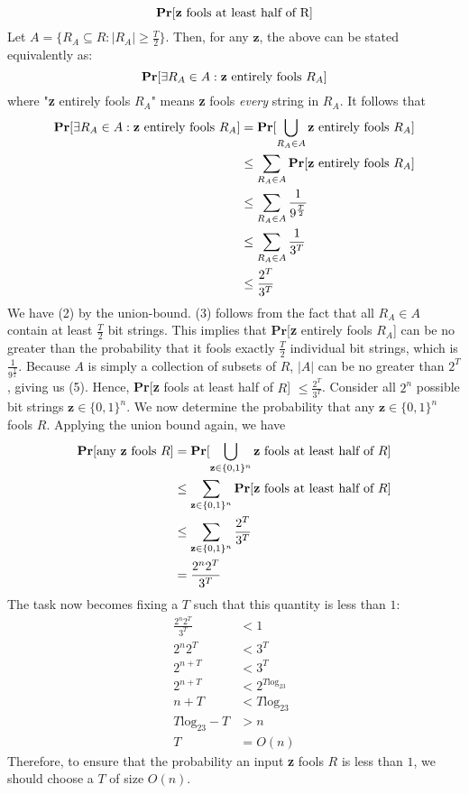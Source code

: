 \documentclass[12pt]{article}
\begin{document}
\begin{solution}
\begin{solution}
\[
\textbf{Pr}[\text{\textbf{z} fools at least half of R}]
\]
Let $A = \{R_A \subseteq R : |R_A| \geq \frac{T}{2}\}$. Then, for any $\textbf{z}$, the above can be stated equivalently as:
\[
\textbf{Pr}[\exists R_A \in A : \text{\textbf{z} entirely fools }R_A]
\]
where "\textbf{z} entirely fools $R_A$" means \textbf{z} fools \textit{every} string in $R_A$. It follows that
\begin{align}
    \textbf{Pr}[\exists R_A \in A : \text{\textbf{z} entirely fools }R_A] &= \textbf{Pr}[\bigcup\limits_{R_A \in A} \text{\textbf{z} entirely fools }R_A] \\
    &\leq \sum\limits_{R_A \in A} \textbf{Pr}[\text{\textbf{z} entirely fools }R_A] \\
    &\leq \sum\limits_{R_A \in A} \frac{1}{9^\frac{T}{2}} \\
    &\leq \sum\limits_{R_A \in A} \frac{1}{3^T} \\
    &\leq \frac{2^T}{3^T}
\end{align}
We have (2) by the union-bound. (3) follows from the fact that all $R_A \in A$ contain at least $\frac{T}{2}$ bit strings. This implies that $\textbf{Pr}$[\textbf{z} entirely fools $R_A$] can be no greater than the probability that it fools exactly $\frac{T}{2}$ individual bit strings, which is $\frac{1}{9^{\frac{T}{2}}}$. Because $A$ is simply a collection of subsets of $R$, $|A|$ can be no greater than $2^T$, giving us (5). Hence, \textbf{Pr}[\textbf{z} fools at least half of $R$] $\leq \frac{2^T}{3^T}$. Consider all $2^n$ possible bit strings $\textbf{z} \in \{0,1\}^n$. We now determine the probability that any $\textbf{z} \in \{0, 1\}^n$ fools $R$. Applying the union bound again, we have
\begin{align*}
    \textbf{Pr}[\text{any \textbf{z} fools } R] &= \textbf{Pr}[\bigcup\limits_{\textbf{z} \in \{0,1\}^n} \textbf{z} \text{ fools at least half of }R] \\
    &\leq \sum\limits_{\textbf{z} \in \{0,1\}^n} \textbf{Pr}[\textbf{z} \text{ fools at least half of $R$}] \\
    &\leq \sum\limits_{\textbf{z} \in \{0,1\}^n} \frac{2^T}{3^T} \\
    &= \frac{2^n2^T}{3^T}
\end{align*}
The task now becomes fixing a $T$ such that this quantity is less than $1$:
\begin{align*}
    \frac{2^n2^T}{3^T} &< 1 \\
    2^n2^T &< 3^T \\
    2^{n+T} &< 3^T \\
    2^{n+T} &< 2^{T\text{log}_23} \\
    n + T &< T\text{log}_23 \\
    T\text{log}_23 - T &> n \\
    T &= O(n)
\end{align*}
Therefore, to ensure that the probability an input \textbf{z} fools $R$ is less than $1$, we should choose a $T$ of size $O(n)$.


\end{solution}
\end{solution}
\end{document}
